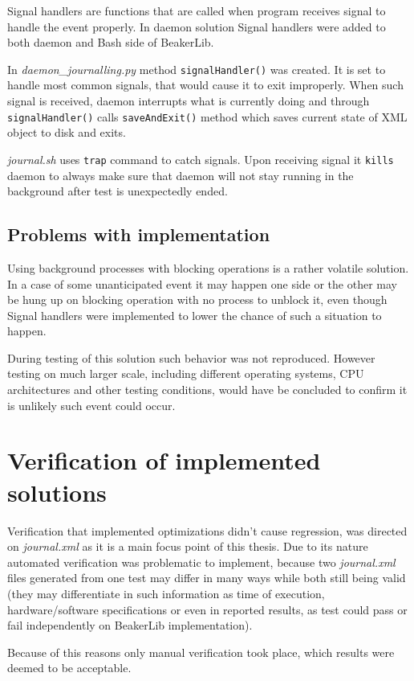 Signal handlers are functions that are called when program receives signal to handle the event properly. In daemon solution Signal handlers were added to both daemon and Bash side of BeakerLib.

In \textit{daemon\_journalling.py} method \texttt{signalHandler()} was created. It is set to handle most common signals, that would cause it to exit improperly. When such signal is received, daemon interrupts what is currently doing and through \texttt{signalHandler()} calls \texttt{saveAndExit()} method which saves current state of XML object to disk and exits.

\textit{journal.sh} uses \texttt{trap} command to catch signals. Upon receiving signal it \texttt{kills} daemon to always make sure that daemon will not stay running in the background after test is unexpectedly ended.  

\subsection{Problems with implementation}
Using background processes with blocking operations is a rather volatile solution. In a case of some unanticipated event it may happen one side or the other may be hung up on blocking operation with no process to unblock it, even though Signal handlers were implemented to lower the chance of such a situation to happen.

During testing of this solution such behavior was not reproduced. However testing on much larger scale, including different operating systems, CPU architectures and other testing conditions, would have be concluded to confirm it is unlikely such event could occur. 


\section{Verification of implemented solutions}
Verification that implemented optimizations didn't cause regression, was directed on \textit{journal.xml} as it is a main focus point of this thesis. Due to its nature automated verification was problematic to implement, because two \textit{journal.xml} files generated from one test may differ in many ways while both still being valid (they may differentiate in such information as time of execution, hardware/software specifications or even in reported results, as test could pass or fail independently on BeakerLib implementation).

Because of this reasons only manual verification took place, which results were deemed to be acceptable.

